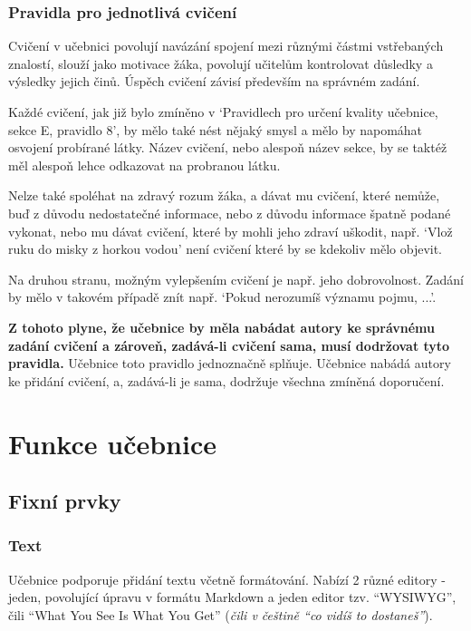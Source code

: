 \documentclass[12pt]{article}
\begin{document}
\subsubsection{Pravidla pro jednotlivá cvičení}

Cvičení v učebnici povolují navázání spojení mezi různými částmi vstřebaných znalostí, slouží jako motivace žáka, povolují učitelům kontrolovat důsledky a výsledky jejich činů. Úspěch cvičení závisí především na správném zadání.

Každé cvičení, jak již bylo zmíněno v \enquote*{Pravidlech pro určení kvality učebnice, sekce E, pravidlo 8}, by mělo také nést nějaký smysl a mělo by napomáhat osvojení probírané látky. Název cvičení, nebo alespoň název sekce, by se taktéž měl alespoň lehce odkazovat na probranou látku.

Nelze také spoléhat na zdravý rozum žáka, a dávat mu cvičení, které nemůže, buď z důvodu nedostatečné informace, nebo z důvodu informace špatně podané vykonat, nebo mu dávat cvičení, které by mohli jeho zdraví uškodit, např. \enquote*{Vlož ruku do misky z horkou vodou} není cvičení které by se kdekoliv mělo objevit.

Na druhou stranu, možným vylepšením cvičení je např. jeho dobrovolnost. Zadání by mělo v takovém případě znít např.  \enquote*{Pokud nerozumíš významu pojmu, ...}.
\cite[s. 61-67]{PAN2023}

\textbf{Z tohoto plyne, že učebnice by měla nabádat autory ke správnému zadání cvičení a zároveň, zadává-li cvičení sama, musí dodržovat tyto pravidla.} Učebnice toto pravidlo jednoznačně splňuje. Učebnice nabádá autory ke přidání cvičení, a, zadává-li je sama, dodržuje všechna zmíněná doporučení.

\newpage
\section{Funkce učebnice}
\subsection{Fixní prvky}
\subsubsection{Text}
Učebnice podporuje přidání textu včetně formátování. Nabízí 2 různé editory - jeden, povolující úpravu v formátu Markdown a jeden editor tzv. \enquote{WYSIWYG}, čili \enquote{What You See Is What You Get} (\textit{čili v češtině \enquote{co vidíš to dostaneš}}).
\end{document}
